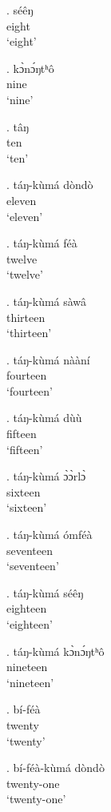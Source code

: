 \documentclass{assets/fieldnotes}
\begin{document}
\exg. séêŋ\\
eight\\
`eight'

\exg. kɔ̀nɔ́ŋtʰô\\
nine\\
`nine'

\exg. tâŋ\\
ten\\
`ten'


\exg. táŋ-kùmá dòndò\\
eleven\\
`eleven'

\exg. táŋ-kùmá féà\\
twelve\\
`twelve'

\exg. táŋ-kùmá sàwâ\\
thirteen\\
`thirteen'

\exg. táŋ-kùmá nààní\\
fourteen\\
`fourteen'

\exg. táŋ-kùmá dùù\\
fifteen\\
`fifteen'

\exg. táŋ-kùmá ɔ̀ɔ̀rlɔ̀\\
sixteen\\
`sixteen'

\exg. táŋ-kùmá ómféà\\
seventeen\\
`seventeen'

\exg. táŋ-kùmá séêŋ\\
eighteen\\
`eighteen' 

\exg. táŋ-kùmá kɔ̀nɔ́ŋtʰô\\
nineteen\\
`nineteen'

\exg. bí-féà\\
twenty\\
`twenty'

\exg. bí-féà-kùmá dòndò\\
twenty-one\\
`twenty-one'
\end{document}
